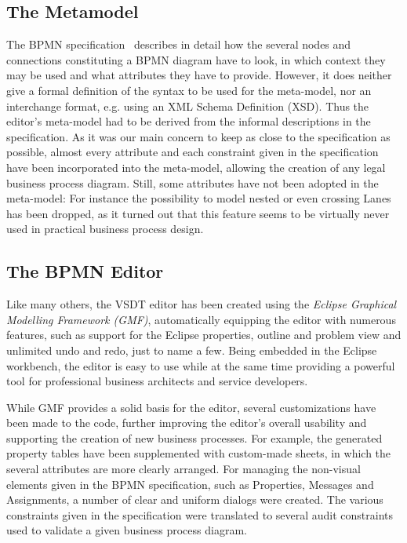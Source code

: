 \subsection{The Metamodel}

The BPMN specification~\cite{omg2011bpmn2} describes in detail how the several
nodes and connections constituting a BPMN diagram have to look, in which context
they may be used and what attributes they have to provide.  However, it does
neither give a formal definition of the syntax to be used for the meta-model, nor
an interchange format, e.g. using an XML Schema Definition (XSD).  Thus the
editor's meta-model had to be derived from the informal descriptions in the
specification.  As it was our main concern to keep as close to the specification
as possible, almost every attribute and each constraint given in the specification
have been incorporated into the meta-model, allowing the creation of any legal
business process diagram.  Still, some attributes have not been adopted in the
meta-model: For instance the possibility to model nested or even crossing Lanes
has been dropped, as it turned out that this feature seems to be virtually never
used in practical business process design.


\subsection{The BPMN Editor}

Like many others, the VSDT editor has been created using the \emph{Eclipse Graphical
Modelling Framework (GMF)}, automatically equipping the editor with numerous
features, such as support for the Eclipse properties, outline and problem view
and unlimited undo and redo, just to name a few.  Being embedded in the Eclipse
workbench, the editor is easy to use while at the same time providing a powerful
tool for professional business architects and service developers.

While GMF provides a solid basis for the editor, several customizations have been
made to the code, further improving the editor's overall usability and supporting
the creation of new business processes.  For example, the generated property
tables have been supplemented with custom-made sheets, in which the several
attributes are more clearly arranged.  For managing the non-visual elements given
in the BPMN specification, such as Properties, Messages and Assignments, a number
of clear and uniform dialogs were created.  The various constraints given in the
specification were translated to several audit constraints used to validate a
given business process diagram.

